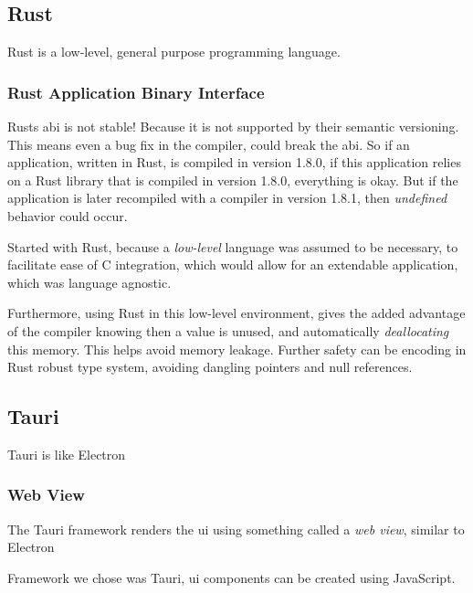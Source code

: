 \subsection{Rust}

Rust is a low-level, general purpose programming language.

\subsubsection{Rust Application Binary Interface}


Rusts \gls{abi} is not stable! Because it is not supported by their semantic
versioning. This means even a bug fix in the compiler, could break the
\gls{abi}. So if an application, written in Rust, is compiled in version 1.8.0,
if this application relies on a Rust library that is compiled in version 1.8.0,
everything is okay. But if the application is later recompiled with a compiler
in version 1.8.1, then \textit{undefined} behavior could occur.


Started with Rust, because a \textit{low-level} language was assumed to be
necessary, to facilitate ease of C integration, which would allow for an
extendable application, which was language agnostic.

Furthermore, using Rust in this low-level environment, gives the added advantage
of the compiler knowing then a value is unused, and automatically
\textit{deallocating} this memory. This helps avoid memory leakage. Further
safety can be encoding in Rust robust type system, avoiding dangling pointers
and null references.



\subsection{Tauri}

Tauri is like Electron

\subsubsection{Web View}

The Tauri framework renders the \gls{ui} using something called a
\textit{web view}, similar to Electron

Framework we chose was Tauri, \gls{ui} components can be created using
JavaScript.

